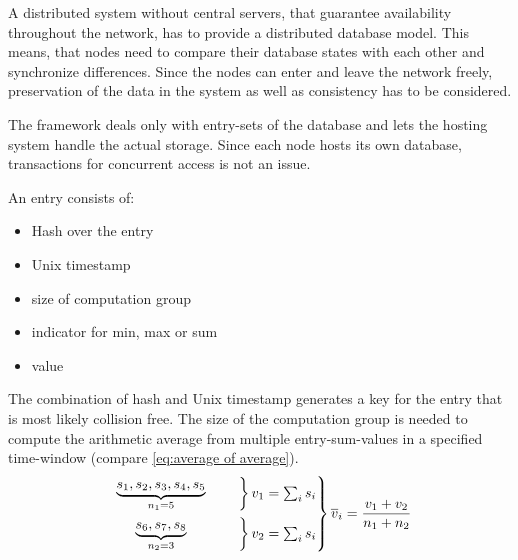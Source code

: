 A distributed system without central servers, that guarantee availability throughout the network, has to provide a distributed database model. This means, that nodes need to compare their database states with each other and synchronize differences. Since the nodes can enter and leave the network freely, preservation of the data in the system as well as consistency has to be considered.

The framework deals only with entry-sets of the database and lets the hosting system handle the actual storage. Since each node hosts its own database, transactions for concurrent access is not an issue.

\noindent An entry consists of:
\begin{itemize}
	\item Hash over the entry
	\item Unix timestamp
	\item size of computation group
	\item indicator for min, max or sum
	\item value
\end{itemize}

The combination of hash and Unix timestamp generates a key for the entry that is most likely collision free. The size of the computation group is needed to compute the arithmetic average from multiple entry-sum-values in a specified time-window (compare \autoref{eq:average of average}).
\begin{align}
\begin{rcases*}
\begin{rcases*}
\mathmakebox[2.5cm][c]{ \underbrace{s_1, s_2, s_3, s_4, s_5}_{n_1=5} }  & \quad
\end{rcases*} v_1=\sum_{i}s_i \\
\begin{rcases*}
\mathmakebox[2.5cm][c]{ \underbrace{s_6, s_7, s_8}_{n_2=3} } & \quad
\end{rcases*} v_2=\sum_{i}s_i
\end{rcases*} \overline{v}_i=\frac{v_1+v_2}{n_1+n_2} \label{eq:average of average}
\end{align}

